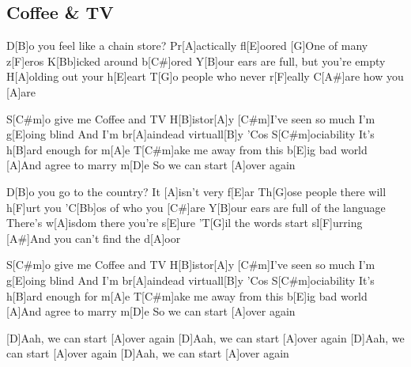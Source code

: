 \subsection*{Coffee \& TV   }
\begin{guitar}
  \begin{multicols}{2}
D[B]o you feel like a chain store?
Pr[A]actically fl[E]oored
[G]One of many z[F]eros
K[Bb]icked around b[C#]ored
Y[B]our ears are full, but you're empty
H[A]olding out your h[E]eart
T[G]o people who never r[F]eally
C[A#]are how you [A]are



S[C#m]o give me Coffee and TV
H[B]istor[A]y 
[C#m]I've seen so much
I'm g[E]oing blind
And I'm br[A]aindead virtuall[B]y
'Cos S[C#m]ociability
It's h[B]ard enough for m[A]e
T[C#m]ake me away from this b[E]ig bad world
[A]And agree to marry m[D]e
So we can start [A]over again



D[B]o you go to the country?
It [A]isn't very f[E]ar
Th[G]ose people there will h[F]urt you
'C[Bb]os of who you [C#]are
Y[B]our ears are full of the language
There's w[A]isdom there you're s[E]ure
'T[G]il the words start sl[F]urring
[A#]And you can't find the d[A]oor
 

\columnbreak

S[C#m]o give me Coffee and TV
H[B]istor[A]y 
[C#m]I've seen so much
I'm g[E]oing blind
And I'm br[A]aindead virtuall[B]y
'Cos S[C#m]ociability
It's h[B]ard enough for m[A]e
T[C#m]ake me away from this b[E]ig bad world
[A]And agree to marry m[D]e
So we can start [A]over again

	

[D]Aah, we can start [A]over again
[D]Aah, we can start [A]over again
[D]Aah, we can start [A]over again
[D]Aah, we can start [A]over again
\end{multicols}
\end{guitar}
